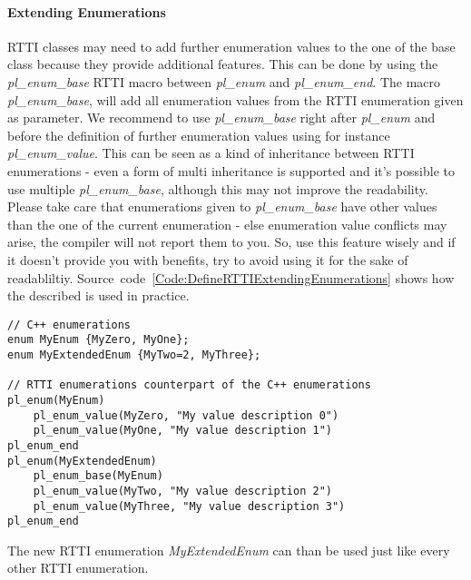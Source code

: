 \paragraph{Extending Enumerations}
\ac{RTTI} classes may need to add further enumeration values to the one of the base class because they provide additional features. This can be done by using the \emph{pl\_enum\_base} \ac{RTTI} macro between \emph{pl\_enum} and \emph{pl\_enum\_end}. The macro \emph{pl\_enum\_base}, will add all enumeration values from the \ac{RTTI} enumeration given as parameter. We recommend to use \emph{pl\_enum\_base} right after \emph{pl\_enum} and before the definition of further enumeration values using for instance \emph{pl\_enum\_value}. This can be seen as a kind of inheritance between \ac{RTTI} enumerations - even a form of multi inheritance is supported and it's possible to use multiple \emph{pl\_enum\_base}, although this may not improve the readability. Please take care that enumerations given to \emph{pl\_enum\_base} have other values than the one of the current enumeration - else enumeration value conflicts may arise, the compiler will not report them to you. So, use this feature wisely and if it doesn't provide you with benefits, try to avoid using it for the sake of readabliltiy. Source~code~\ref{Code:DefineRTTIExtendingEnumerations} shows how the described is used in practice.
\begin{lstlisting}[label=Code:DefineRTTIExtendingEnumerations,caption={Defining an extended \ac{RTTI} enumeration}]
// C++ enumerations
enum MyEnum {MyZero, MyOne};
enum MyExtendedEnum {MyTwo=2, MyThree};

// RTTI enumerations counterpart of the C++ enumerations
pl_enum(MyEnum)
	pl_enum_value(MyZero, "My value description 0")
	pl_enum_value(MyOne, "My value description 1")
pl_enum_end
pl_enum(MyExtendedEnum)
	pl_enum_base(MyEnum)
	pl_enum_value(MyTwo, "My value description 2")
	pl_enum_value(MyThree, "My value description 3")
pl_enum_end
\end{lstlisting}
The new \ac{RTTI} enumeration \emph{MyExtendedEnum} can than be used just like every other \ac{RTTI} enumeration.


